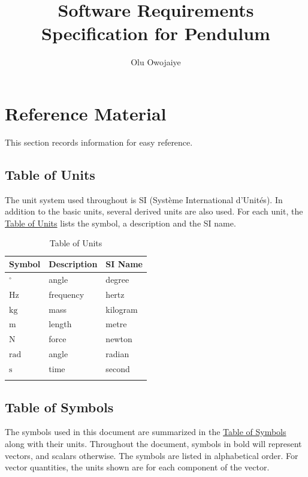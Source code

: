 \documentclass[12pt]{article}
\title{Software Requirements Specification for Pendulum}
\author{Olu Owojaiye}
\begin{document}
\maketitle
\tableofcontents
\newpage
\section{Reference Material}
\label{Sec:RefMat}
This section records information for easy reference.

\subsection{Table of Units}
\label{Sec:ToU}
The unit system used throughout is SI (Système International d'Unités). In addition to the basic units, several derived units are also used. For each unit, the \hyperref[Table:ToU]{Table of Units} lists the symbol, a description and the SI name.

\begin{longtable}{l l l}
\toprule
\textbf{Symbol} & \textbf{Description} & \textbf{SI Name}
\\
\midrule
\endhead
${{}^{\circ}}$ & angle & degree
\\
${\text{Hz}}$ & frequency & hertz
\\
${\text{kg}}$ & mass & kilogram
\\
${\text{m}}$ & length & metre
\\
${\text{N}}$ & force & newton
\\
${\text{rad}}$ & angle & radian
\\
${\text{s}}$ & time & second
\\
\bottomrule
\caption{Table of Units}
\label{Table:ToU}
\end{longtable}
\subsection{Table of Symbols}
\label{Sec:ToS}
The symbols used in this document are summarized in the \hyperref[Table:ToS]{Table of Symbols} along with their units. Throughout the document, symbols in bold will represent vectors, and scalars otherwise. The symbols are listed in alphabetical order. For vector quantities, the units shown are for each component of the vector.
\end{document}
